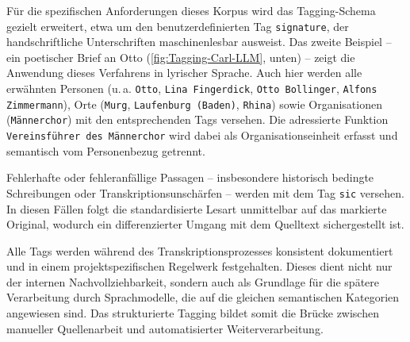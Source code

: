 \documentclass[12pt, a4paper, ngerman, bidi=default]{article}
\begin{document}
Für die spezifischen Anforderungen dieses Korpus wird das Tagging-Schema gezielt erweitert, etwa um den benutzerdefinierten Tag \texttt{signature}, 
der handschriftliche Unterschriften maschinenlesbar ausweist. Das zweite Beispiel – ein poetischer Brief an Otto (\autoref{fig:Tagging-Carl-LLM}, unten) – 
zeigt die Anwendung dieses Verfahrens in lyrischer Sprache. Auch hier werden alle erwähnten Personen (u.\,a. \texttt{Otto}, \texttt{Lina Fingerdick}, 
\texttt{Otto Bollinger}, \texttt{Alfons Zimmermann}), Orte (\texttt{Murg}, \texttt{Laufenburg (Baden)}, \texttt{Rhina}) sowie Organisationen 
(\texttt{Männerchor}) mit den entsprechenden Tags versehen. Die adressierte Funktion \texttt{Vereinsführer des Männerchor} wird dabei 
als Organisationseinheit erfasst und semantisch vom Personenbezug getrennt.

Fehlerhafte oder fehleranfällige Passagen – insbesondere historisch bedingte Schreibungen oder Transkriptionsunschärfen – 
werden mit dem Tag \texttt{sic} versehen. In diesen Fällen folgt die standardisierte Lesart unmittelbar auf das markierte Original, 
wodurch ein differenzierter Umgang mit dem Quelltext sichergestellt ist.

Alle Tags werden während des Transkriptionsprozesses konsistent dokumentiert und in einem projektspezifischen Regelwerk festgehalten. 
Dieses dient nicht nur der internen Nachvollziehbarkeit, sondern auch als Grundlage für die spätere Verarbeitung durch Sprachmodelle, 
die auf die gleichen semantischen Kategorien angewiesen sind. Das strukturierte Tagging bildet somit die Brücke zwischen manueller 
Quellenarbeit und automatisierter Weiterverarbeitung.
\end{document}
